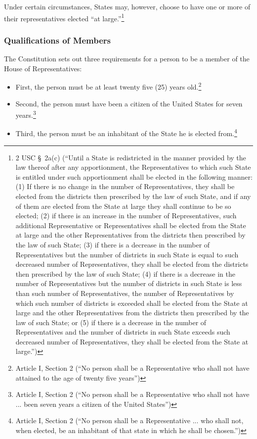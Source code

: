 Under certain circumstances, States may, however, choose to have one or more of their representatives elected ``at large.''\footnote{2 USC \S\ 2a(c) (``Until a State is redistricted in the manner provided by the law thereof after any apportionment, the Representatives to which such State is entitled under such apportionment shall be elected in the following manner: (1) If there is no change in the number of Representatives, they shall be elected from the districts then prescribed by the law of such State, and if any of them are elected from the State at large they shall continue to be so elected; (2) if there is an increase in the number of Representatives, such additional Representative or Representatives shall be elected from the State at large and the other Representatives from the districts then prescribed by the law of such State; (3) if there is a decrease in the number of Representatives but the number of districts in such State is equal to such decreased number of Representatives, they shall be elected from the districts then prescribed by the law of such State; (4) if there is a decrease in the number of Representatives but the number of districts in such State is less than such number of Representatives, the number of Representatives by which such number of districts is exceeded shall be elected from the State at large and the other Representatives from the districts then prescribed by the law of such State; or (5) if there is a decrease in the number of Representatives and the number of districts in such State exceeds such decreased number of Representatives, they shall be elected from the State at large.'')}

\subsubsection{Qualifications of Members}
The Constitution sets out three requirements for a person to be a member of the House of Representatives:
\begin{itemize}
\item First, the person must be at least twenty five (25) years old.\footnote{Article I, Section 2 (``No person shall be a Representative who shall not have attained to the age of twenty five years'')}
\item Second, the person must have been a citizen of the United States for seven years.\footnote{Article I, Section 2 (``No person shall be a Representative who shall not have ... been seven years a citizen of the United States'')}
\item Third, the person must be an inhabitant of the State he is elected from.\footnote{Article I, Section 2 (``No person shall be a Representative ... who shall not, when elected, be an inhabitant of that state in which he shall be chosen.'')}
\end{itemize}


